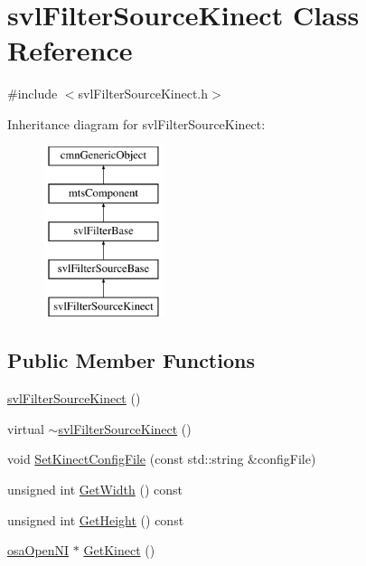 \hypertarget{classsvl_filter_source_kinect}{\section{svl\-Filter\-Source\-Kinect Class Reference}
\label{classsvl_filter_source_kinect}
}


{\ttfamily \#include $<$svl\-Filter\-Source\-Kinect.\-h$>$}

Inheritance diagram for svl\-Filter\-Source\-Kinect\-:\begin{figure}[H]
\begin{center}
\leavevmode
\includegraphics[height=5.000000cm]{de/d1a/classsvl_filter_source_kinect}
\end{center}
\end{figure}
\subsection*{Public Member Functions}
\begin{DoxyCompactItemize}
\item 
\hyperlink{classsvl_filter_source_kinect_aa477abf2df88dd5840674b6b99da6520}{svl\-Filter\-Source\-Kinect} ()
\item 
virtual \hyperlink{classsvl_filter_source_kinect_a30fe905e03ba4c84e6da060a167d9641}{$\sim$svl\-Filter\-Source\-Kinect} ()
\item 
void \hyperlink{classsvl_filter_source_kinect_ae70437314bf55cb74fc70d1820ee0576}{Set\-Kinect\-Config\-File} (const std\-::string \&config\-File)
\item 
unsigned int \hyperlink{classsvl_filter_source_kinect_aeb40cbf785d39a6d7a16d3ab428e6bbb}{Get\-Width} () const 
\item 
unsigned int \hyperlink{classsvl_filter_source_kinect_a9d6710ea61786113d5075752d0fd85b3}{Get\-Height} () const 
\item 
\hyperlink{classosa_open_n_i}{osa\-Open\-N\-I} $\ast$ \hyperlink{classsvl_filter_source_kinect_aabd8d15d05fc59a0413654816bf57198}{Get\-Kinect} ()
\end{DoxyCompactItemize}
